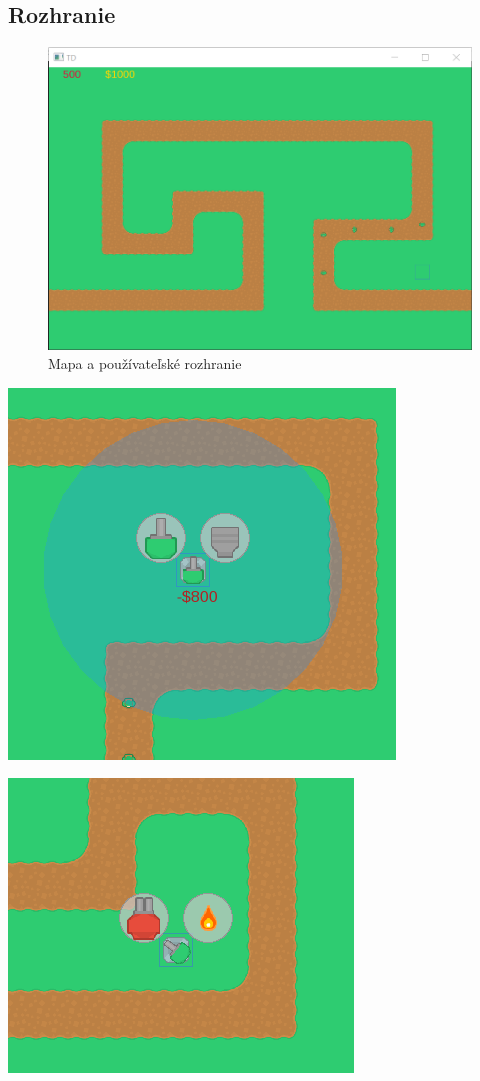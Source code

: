 \documentclass[12pt]{article}
\begin{document}
\subsection{Rozhranie}

\begin{figure}[h]
    \includegraphics{images/hra.png}
    \caption{Mapa a používateľské rozhranie}
\end{figure}

\includegraphics{images/contextmenu.png}

\includegraphics{images/upgrade.png}
\end{document}
